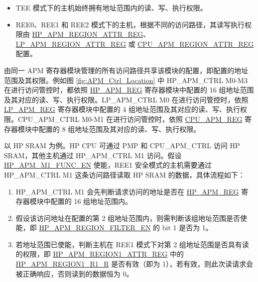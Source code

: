 \documentclass[main\_\_CN.tex]{subfiles}
\begin{document}
\begin{itemize}

    \item TEE 模式下的主机始终拥有地址范围内的读、写、执行权限。
    \item REE0、REE1 和 REE2 模式下的主机，根据不同的访问路径，其读写执行权限由 \hyperref[regdesc:HPAPMREGIONNATTRREG]{HP\_APM\_REGION\_ATTR\_REG}、\hyperref[regdesc:LPAPMREGIONNATTRREG]{LP\_APM\_REGION\_ATTR\_REG} 或 \hyperref[regdesc:CPUAPMREGIONNATTRREG]{CPU\_APM\_REGION\_ATTR\_REG} 配置。

\end{itemize}

由同一 APM 寄存器模块管理的所有访问路径共享该模块的配置，即配置的地址范围及其权限。例如图 \ref{fig:APM_Ctrl_Location} 中 HP\_APM\_CTRL M0-M3 在进行访问管控时，都依照 \hyperref[sec:permctrl-reg-hp]{HP\_APM\_REG} 寄存器模块中配置的 16 组地址范围及其对应的读、写、执行权限。LP\_APM\_CTRL M0 在进行访问管控时，依照 \hyperref[sec:permctrl-reg-lp]{LP\_APM\_REG} 寄存器模块中配置的 4 组地址范围及其对应的读、写、执行权限。CPU\_APM\_CTRL M0-M1 在进行访问管控时，依照 \hyperref[sec:permctrl-reg-cpu]{CPU\_APM\_REG} 寄存器模块中配置的 8 组地址范围及其对应的读、写、执行权限。

以 HP SRAM 为例。HP CPU 可通过 PMP 和 CPU\_APM\_CTRL 访问 HP SRAM，其他主机通过 HP\_APM\_CTRL M1 访问。假设 \hyperref[fielddesc:HPAPMM1FUNCEN]{HP\_APM\_M1\_FUNC\_EN} 使能，REE1 安全模式的主机需要通过 HP\_APM\_CTRL M1 这条访问路径读取 HP SRAM 的数据，具体流程如下：

\begin{enumerate}
    \item HP\_APM\_CTRL M1 会先判断请求访问的地址是否在 \hyperref[sec:permctrl-reg-hp]{HP\_APM\_REG} 寄存器模块中配置的 16 组地址范围内。
    \item 假设该访问地址在配置的第 2 组地址范围内，则需判断该组地址范围是否使能，即 \hyperref[fielddesc:HPAPMREGIONFILTEREN]{HP\_APM\_REGION\_FILTER\_EN} 的 bit 1 是否为 1。
    \item 若地址范围已使能，判断主机在 REE1 模式下对第 2 组地址范围是否具有读的权限，即  \hyperref[regdesc:HPAPMREGIONNATTRREG]{HP\_APM\_REGION1\_ATTR\_REG} 中的 \hyperref[fielddesc:HPAPMREGIONNR1R]{HP\_APM\_REGION1\_R1\_R} 是否有效（即为 1），若有效，则此次读请求会被正确响应，否则读到的数据恒为 0。
\end{enumerate}
\end{document}
